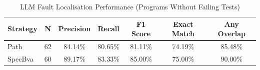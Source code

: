 \begin{table}[htbp]
\centering
\caption{LLM Fault Localisation Performance (Programs Without Failing Tests)}
\label{tab:llm_metrics_passing}
\begin{tabular}{l c c c c c c}
\hline
\textbf{Strategy} & \textbf{N} & \textbf{Precision} & \textbf{Recall} & \textbf{F1 Score} & \textbf{Exact Match} & \textbf{Any Overlap} \\
\hline
Path & 62 & 84.14\% & 80.65\% & 81.11\% & 74.19\% & 85.48\% \\
SpecBva & 60 & 89.17\% & 83.33\% & 85.00\% & 75.00\% & 90.00\% \\
\hline
\end{tabular}
\end{table}
